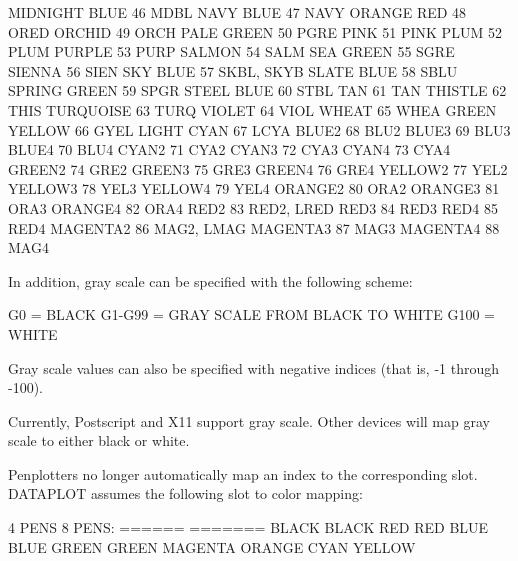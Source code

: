         MIDNIGHT BLUE      46       MDBL
        NAVY BLUE          47       NAVY
        ORANGE RED         48       ORED
        ORCHID             49       ORCH
        PALE GREEN         50       PGRE
        PINK               51       PINK
        PLUM               52       PLUM
        PURPLE             53       PURP
        SALMON             54       SALM
        SEA GREEN          55       SGRE
        SIENNA             56       SIEN
        SKY BLUE           57       SKBL, SKYB
        SLATE BLUE         58       SBLU
        SPRING GREEN       59       SPGR
        STEEL BLUE         60       STBL
        TAN                61       TAN
        THISTLE            62       THIS
        TURQUOISE          63       TURQ
        VIOLET             64       VIOL
        WHEAT              65       WHEA
        GREEN YELLOW       66       GYEL
        LIGHT CYAN         67       LCYA
        BLUE2              68       BLU2
        BLUE3              69       BLU3
        BLUE4              70       BLU4
        CYAN2              71       CYA2
        CYAN3              72       CYA3
        CYAN4              73       CYA4
        GREEN2             74       GRE2
        GREEN3             75       GRE3
        GREEN4             76       GRE4
        YELLOW2            77       YEL2
        YELLOW3            78       YEL3
        YELLOW4            79       YEL4
        ORANGE2            80       ORA2
        ORANGE3            81       ORA3
        ORANGE4            82       ORA4
        RED2               83       RED2, LRED
        RED3               84       RED3
        RED4               85       RED4
        MAGENTA2           86       MAG2, LMAG
        MAGENTA3           87       MAG3
        MAGENTA4           88       MAG4
 
 
In addition, gray scale can be specified with the following scheme:
 
        G0     = BLACK
        G1-G99 = GRAY SCALE FROM BLACK TO WHITE
        G100   = WHITE
 
Gray scale values can also be specified with negative indices (that is,
-1 through -100).
 
Currently, Postscript and X11 support gray scale.  Other devices will
map gray scale to either black or white.
 
Penplotters no longer automatically map an index to the corresponding
slot.  DATAPLOT assumes the following slot to color mapping:
 
        4 PENS            8 PENS:
        ======            =======
        BLACK             BLACK
        RED               RED
        BLUE              BLUE
        GREEN             GREEN
                          MAGENTA
                          ORANGE
                          CYAN
                          YELLOW
 
